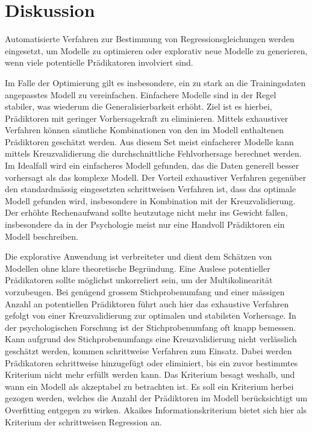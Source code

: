 \section{Diskussion}
Automatisierte Verfahren zur Bestimmung von Regressionsgleichungen werden eingesetzt, um Modelle zu optimieren oder explorativ neue Modelle zu generieren, wenn viele potentielle Prädikatoren involviert sind. 

Im Falle der Optimierung gilt es insbesondere, ein zu stark an die Trainingsdaten angepasstes Modell zu vereinfachen. 
Einfachere Modelle sind in der Regel stabiler, was wiederum die Generalisierbarkeit erhöht.
Ziel ist es hierbei, Prädiktoren mit geringer Vorhersagekraft zu eliminieren. Mittels exhaustiver Verfahren können sämtliche Kombinationen von den im Modell enthaltenen Prädiktoren geschätzt werden.
Aus diesem Set meist einfacherer Modelle kann mittels Kreuzvalidierung die durchschnittliche Fehlvorhersage berechnet werden. Im Idealfall wird ein einfacheres Modell gefunden, das die Daten generell besser vorhersagt als das komplexe Modell.
Der Vorteil exhaustiver Verfahren gegenüber den standardmässig eingesetzten schrittweisen Verfahren ist, dass das optimale Modell gefunden wird, insbesondere in Kombination mit der Kreuzvalidierung.
Der erhöhte Rechenaufwand sollte heutzutage nicht mehr ins Gewicht fallen, insbesondere da in der Psychologie meist nur eine Handvoll Prädiktoren ein Modell beschreiben.  

Die explorative Anwendung ist verbreiteter und dient dem Schätzen von Modellen ohne klare theoretische Begründung.
Eine Auslese potentieller Prädikatoren sollte möglichst unkorreliert sein, um der Multikolinearität vorzubeugen. Bei genügend grossem Stichprobenumfang und einer mässigen Anzahl an potentiellen Prädiktoren führt auch hier das exhaustive Verfahren gefolgt von einer Kreuzvalidierung zur optimalen und stabilsten Vorhersage. In der psychologischen Forschung ist der Stichprobenumfang oft knapp bemessen. Kann aufgrund des Stichprobenumfangs eine Kreuzvalidierung nicht verlässlich geschätzt werden, kommen schrittweise Verfahren zum Einsatz. Dabei werden Prädikatoren schrittweise hinzugefügt oder eliminiert, bis ein zuvor bestimmtes Kriterium nicht mehr erfüllt werden kann. Das Kriterium  besagt weshalb, und wann ein Modell als akzeptabel zu betrachten ist.
Es soll ein Kriterium herbei gezogen werden, welches die Anzahl der Prädiktoren im Modell berücksichtigt um Overfitting entgegen zu wirken.
Akaikes Informationskriterium bietet sich hier als Kriterium  der schrittweisen Regression an.  

